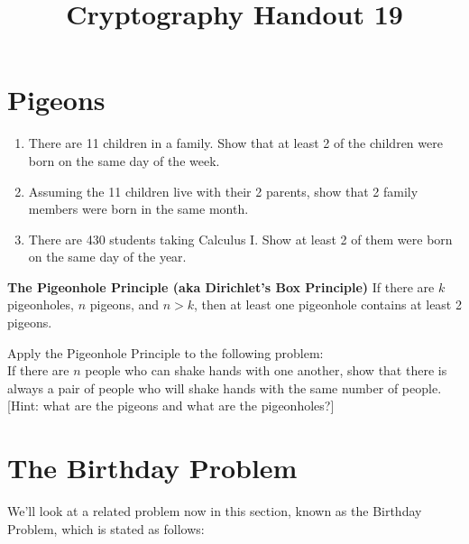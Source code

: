 \documentclass[12pt]{amsart}
\makeatletter
\def\subtitle#1{\gdef\@subtitle{#1}}
\def\@subtitle{}
\theoremstyle{plain}
\theoremstyle{definition}
\theoremstyle{remark}
\makeatother
\begin{document}
\onehalfspacing

\title[]{Cryptography Handout 19}
\subtitle{Pigeon Birthday Parties}
\maketitle

\section{Pigeons}
\begin{enumerate}[1.]
	\item There are 11 children in a family.  Show that at least 2 of the children were born on the same day of the week.\\ \vspace{1.5in}
	\item Assuming the 11 children live with their 2 parents, show that 2 family members were born in the same month.\\ \vspace{1.5in}
	\item There are 430 students taking Calculus I.  Show at least 2 of them were born on the same day of the year.\\ \vspace{1.5in}
\end{enumerate}

\newpage \begin{framed}
\noindent \textbf{The Pigeonhole Principle (aka Dirichlet's Box Principle)} If there are $k$ pigeonholes, $n$ pigeons, and $n > k$, then at least one pigeonhole contains at least 2 pigeons.
\end{framed}

Apply the Pigeonhole Principle to the following problem:\\
 If there are $n$ people who can shake hands with one another, show that there is always a pair of people who will shake hands with the same number of people. [Hint: what are the pigeons and what are the pigeonholes?]\\ \vspace{2.5in}


\section{The Birthday Problem}
We'll look at a related problem now in this section, known as the Birthday Problem, which is stated as follows:\\
\end{document}
